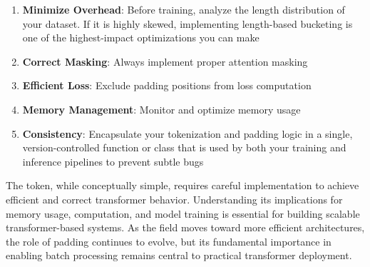 \begin{principle}
\begin{enumerate}
\item \textbf{Minimize Overhead}: Before training, analyze the length distribution of your dataset. If it is highly skewed, implementing length-based bucketing is one of the highest-impact optimizations you can make
\item \textbf{Correct Masking}: Always implement proper attention masking
\item \textbf{Efficient Loss}: Exclude padding positions from loss computation
\item \textbf{Memory Management}: Monitor and optimize memory usage
\item \textbf{Consistency}: Encapsulate your tokenization and padding logic in a single, version-controlled function or class that is used by both your training and inference pipelines to prevent subtle bugs
\end{enumerate}
\end{principle}

The \pad{} token, while conceptually simple, requires careful implementation to achieve efficient and correct transformer behavior. Understanding its implications for memory usage, computation, and model training is essential for building scalable transformer-based systems. As the field moves toward more efficient architectures, the role of padding continues to evolve, but its fundamental importance in enabling batch processing remains central to practical transformer deployment.